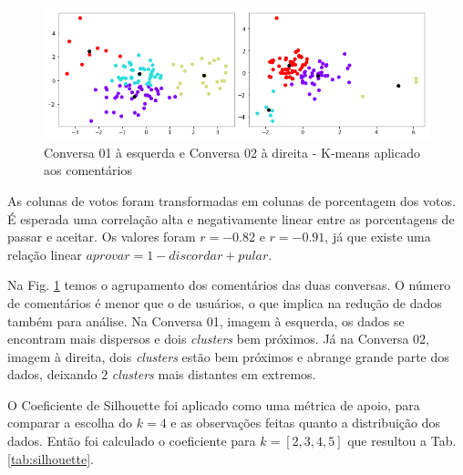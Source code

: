 \begin{figure}[!h]
	\centering
	\includegraphics[keepaspectratio=true,scale=0.6]{figuras/tcc2/cluster-comentario/compara-comentarios.png}
	\caption{Conversa 01 à esquerda e Conversa 02 à direita - K-means aplicado aos comentários}
	\label{fig:k-means-comentario-conversas}
\end{figure}


As colunas de votos foram transformadas em colunas de porcentagem dos votos. É esperada uma correlação alta e negativamente linear entre as porcentagens de passar e aceitar. Os valores foram $r=-0.82$ e $r=-0.91$, já que existe uma relação linear $aprovar = 1 - discordar + pular$.





Na Fig. \ref{fig:k-means-comentario-conversas} temos o agrupamento dos comentários das duas conversas. O número de comentários é menor que o de usuários, o que implica na redução de dados também para análise. Na Conversa 01, imagem à esquerda, os dados se encontram mais dispersos e dois \textit{clusters} bem próximos. Já na Conversa 02, imagem à direita, dois \textit{clusters} estão bem próximos e abrange grande parte dos dados, deixando $2$ \textit{clusters} mais distantes em extremos. 

O Coeficiente de Silhouette foi aplicado como uma métrica de apoio, para comparar a escolha do $k=4$ e as observações feitas quanto a distribuição dos dados. Então foi calculado o coeficiente para $k=[2,3,4,5]$ que resultou a Tab. \ref{tab:silhouette}. 


